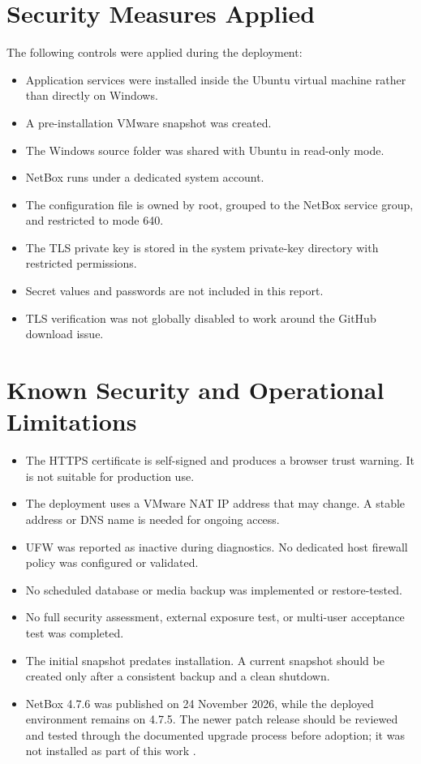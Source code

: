 \documentclass[11pt,a4paper,oneside]{report}
\begin{document}
\section{Security Measures Applied}
The following controls were applied during the deployment:
\begin{itemize}
  \item Application services were installed inside the Ubuntu virtual machine rather than directly on Windows.
  \item A pre-installation VMware snapshot was created.
  \item The Windows source folder was shared with Ubuntu in read-only mode.
  \item NetBox runs under a dedicated system account.
  \item The configuration file is owned by root, grouped to the NetBox service group, and restricted to mode 640.
  \item The TLS private key is stored in the system private-key directory with restricted permissions.
  \item Secret values and passwords are not included in this report.
  \item TLS verification was not globally disabled to work around the GitHub download issue.
\end{itemize}

\section{Known Security and Operational Limitations}
\begin{itemize}
  \item The HTTPS certificate is self-signed and produces a browser trust warning. It is not suitable for production use.
  \item The deployment uses a VMware NAT IP address that may change. A stable address or DNS name is needed for ongoing access.
  \item UFW was reported as inactive during diagnostics. No dedicated host firewall policy was configured or validated.
  \item No scheduled database or media backup was implemented or restore-tested.
  \item No full security assessment, external exposure test, or multi-user acceptance test was completed.
  \item The initial snapshot predates installation. A current snapshot should be created only after a consistent backup and a clean shutdown.
  \item NetBox 4.7.6 was published on 24 November 2026, while the deployed environment remains on 4.7.5. The newer patch release should be reviewed and tested through the documented upgrade process before adoption; it was not installed as part of this work \cite{upgrade,release-476}.
\end{itemize}
\end{document}
